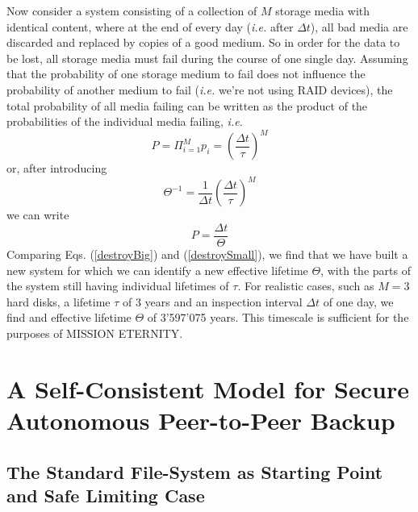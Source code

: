 \documentclass[11pt]{article}
\begin{document}
\begin{mainmatter}
Now consider a system consisting of a collection of $M$ storage media with identical content, where at the end of every day (\emph{i.e.} after $\Delta t$), all bad media are discarded and replaced by copies of a good medium. So in order for the data to be lost, all storage media must fail during the course of one single day. Assuming that the probability of one storage medium to fail does not influence the probability of another medium to fail (\emph{i.e.} we're not using RAID devices), the total probability of all media failing can be written as the product of the probabilities of the individual media failing, \emph{i.e.}
\begin{equation}
P = \Pi_{i = 1}^M p_i = \left(\frac{\Delta t}{\tau}\right)^M
\end{equation}
or, after introducing
\begin{equation}
\Theta^{-1} = \frac{1}{\Delta t} \left(\frac{\Delta t}{\tau}\right)^M
\end{equation}
we can write
\begin{equation}
P =  \frac{\Delta t}{\Theta}
\label{destroyBig}
\end{equation}
Comparing Eqs. (\ref{destroyBig}) and (\ref{destroySmall}), we find that we have built a new system for which we can identify a new effective lifetime $\Theta$, with the parts of the system still having individual lifetimes of $\tau$. For realistic cases, such as $M = 3$ hard disks, a lifetime $\tau$ of 3 years and an inspection interval $\Delta t$ of one day, we find and effective lifetime $\Theta$ of 3'597'075 years. This timescale is sufficient for the purposes of MISSION ETERNITY.

\section{A Self-Consistent Model for Secure Autonomous Peer-to-Peer Backup}
\label{backup}

\subsection{The Standard File-System as Starting Point and Safe Limiting Case}


\end{mainmatter}
\end{document}
